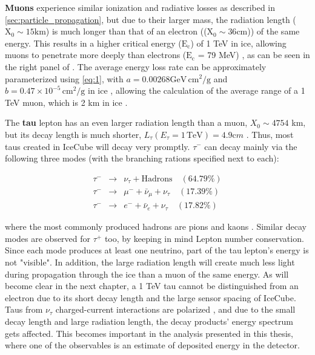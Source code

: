 \textbf{Muons} experience similar ionization and radiative losses as described in \ref{sec:particle_propagation}, but due to their larger mass, the radiation length ($\mathrm{X}_0 \sim 15 \mathrm{km}$) is much longer than that of an electron (($\mathrm{X}_0 \sim 36 \mathrm{cm}$)) of the same energy. This results in a higher critical energy ($\mathrm{E}_\mathrm{c}$) of 1 TeV in ice, allowing muons to penetrate more deeply than electrons ($\mathrm{E}_\mathrm{c}$ = 79 MeV) \cite{MMC_paper}, as can be seen in the right panel of . The average energy loss rate can be approximately parameterized using \ref{eq:1}, with $a = 0.00268 \mathrm{GeV}\, \mathrm{cm}^2/\mathrm{g}$ and $b = 0.47 \times 10^{-5} \, \mathrm{cm}^2/\mathrm{g}$ in ice \cite{PDG_2024}, allowing the calculation of the average range of a 1 TeV muon, which is 2 km in ice .

The \textbf{tau} lepton has an even larger radiation length than a muon, $X_0 \sim 4754$ km, but its decay length is much shorter, $L_{\tau} (E_{\tau} = 1 \, \text{TeV}) = 4.9 \mathrm cm$ \cite{PDG_2024}. Thus, most taus created in IceCube will decay very promptly. $\tau^{-}$ can decay mainly via the following three modes (with the branching rations specified next to each):


\begin{equation}\label{eq:tau_decay}
    \begin{array}{rcl}
        \tau^{-} &\rightarrow& \nu_{\tau} + \text{Hadrons} \quad (64.79\%) \\
        \tau^{-} &\rightarrow& \mu^{-} + \bar{\nu}_{\mu} + \nu_{\tau} \quad (17.39\%) \\
        \tau^{-} &\rightarrow& e^{-} + \bar{\nu}_{e} + \nu_{\tau} \quad (17.82\%)
    \end{array}
\end{equation}
    
where the most commonly produced hadrons are pions and kaons \cite{PDG_2024}. Similar decay modes are observed for  $\tau^{+}$ too, by keeping in mind Lepton number conservation. Since each mode produces at least one neutrino, part of the tau lepton's energy is not "visible". In addition, the large radiation length will create much less light during propagation through the ice than a muon of the same energy. As will become clear in the next chapter, a 1 TeV tau cannot be distinguished from an electron due to its short decay length and the large sensor spacing of IceCube. Taus from $\nu_{\tau}$ charged-current interactions are polarized , and due to the small decay length and large radiation length, the decay products' energy spectrum gets affected. This becomes important in the analysis presented in this thesis, where one of the observables is an estimate of deposited energy in the detector.


